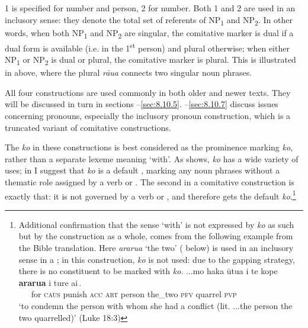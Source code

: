 1 is specified for number and person, 2 for number. Both 1 and 2 are used in an inclusory sense: they denote the total set of referents of NP\textsubscript{1} and NP\textsubscript{2}. In other words, when both NP\textsubscript{1} and NP\textsubscript{2} are singular, the comitative marker is dual if a dual form is available (i.e. in the 1\textsuperscript{st} person) and plural otherwise; when either NP\textsubscript{1} or NP\textsubscript{2} is dual or plural, the comitative marker is plural. This is illustrated in  above, where the plural \textit{rāua} connects two singular noun phrases.

All four constructions are used commonly in both older and newer texts. They will be discussed in turn in sections –\ref{sec:8.10.5}. –\ref{sec:8.10.7} discuss issues concerning pronouns, especially the inclusory pronoun construction, which is a truncated variant of comitative constructions.

The  \textit{ko} in these constructions is best considered as the prominence marking \textit{ko}, rather than a separate lexeme meaning ‘with’. As  shows, \textit{ko} has a wide variety of uses; in  I suggest that \textit{ko} is a default , marking any noun phrases without a thematic role assigned by a verb or . The second  in a comitative construction is exactly that: it is not governed by a verb or , and therefore gets the default  \textit{ko}.\footnote{\label{fn:447}Additional confirmation that the sense ‘with’ is not expressed by \textit{ko} as such but by the construction as a whole, comes from the following example from the Bible translation. Here \textit{ararua} ‘the two’ ( below) is used in an inclusory sense in a ; in this construction, \textit{ko} is not used: due to the gapping strategy, there is no constituent to be marked with \textit{ko}. 
\ea
\gll  
...mo haka ūtu{\ꞌ}a i te kope {\ob}\textbf{ararua} i ture ai\,{\cb}.\\
  ~~~for \textsc{caus} punish \textsc{acc} \textsc{art} person {\db}the\_two \textsc{pfv} quarrel \textsc{pvp}\\
\glt   
‘to condemn the person with whom she had a conflict (lit. ...the person the two quarrelled)’ (Luke 18:3)
\z
} 

